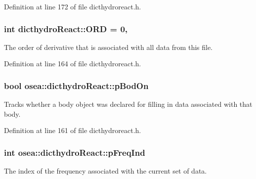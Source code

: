 Definition at line 172 of file dicthydroreact.\-h.

\hypertarget{classosea_1_1dicthydro_react_a4fbb539436f3d6ab7d8e4d354db291ad}{
\subsubsection[{O\-R\-D}]{\setlength{\rightskip}{0pt plus 5cm}int dicthydro\-React\-::\-O\-R\-D = 0\hspace{0.3cm}{\ttfamily [static]}, {\ttfamily [protected]}}}\label{classosea_1_1dicthydro_react_a4fbb539436f3d6ab7d8e4d354db291ad}
The order of derivative that is associated with all data from this file. 

Definition at line 164 of file dicthydroreact.\-h.

\hypertarget{classosea_1_1dicthydro_react_a66a8bc48d4406b143b7050e2086b6cbb}{
\subsubsection[{p\-Bod\-On}]{\setlength{\rightskip}{0pt plus 5cm}bool osea\-::dicthydro\-React\-::p\-Bod\-On\hspace{0.3cm}{\ttfamily [protected]}}}\label{classosea_1_1dicthydro_react_a66a8bc48d4406b143b7050e2086b6cbb}
Tracks whether a body object was declared for filling in data associated with that body. 

Definition at line 161 of file dicthydroreact.\-h.

\hypertarget{classosea_1_1dicthydro_react_aba130db9eb0cd8aa4203bb2a58fb4932}{
\subsubsection[{p\-Freq\-Ind}]{\setlength{\rightskip}{0pt plus 5cm}int osea\-::dicthydro\-React\-::p\-Freq\-Ind\hspace{0.3cm}{\ttfamily [protected]}}}\label{classosea_1_1dicthydro_react_aba130db9eb0cd8aa4203bb2a58fb4932}
The index of the frequency associated with the current set of data. 

